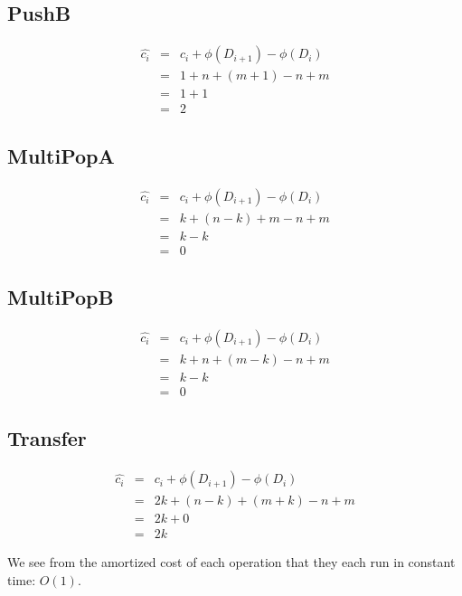 \documentclass[a4paper,11pt]{article}
\begin{document}
\subsection*{PushB}
\begin{eqnarray}
\hat{c_{i}} &=& c_{i} + \phi(D_{i+1}) - \phi(D_{i}) \\
&=& 1 + n + (m+1) - n + m \\ 
&=& 1 + 1 \\
&=& 2
\end{eqnarray}

\subsection*{MultiPopA}
\begin{eqnarray}
\hat{c_{i}} &=& c_{i} + \phi(D_{i+1}) - \phi(D_{i}) \\
&=& k + (n-k) + m - n + m \\ 
&=& k - k \\
&=& 0
\end{eqnarray}

\subsection*{MultiPopB}
\begin{eqnarray}
\hat{c_{i}} &=& c_{i} + \phi(D_{i+1}) - \phi(D_{i}) \\
&=& k + n + (m-k) - n + m \\ 
&=& k - k \\
&=& 0
\end{eqnarray}

\subsection*{Transfer}
\begin{eqnarray}
\hat{c_{i}} &=& c_{i} + \phi(D_{i+1}) - \phi(D_{i}) \\
&=& 2k + (n-k) + (m+k) - n + m \\ 
&=& 2k + 0 \\
&=& 2k
\end{eqnarray}

We see from the amortized cost of each operation that they each run in constant time: $O(1)$.  
\end{document}
